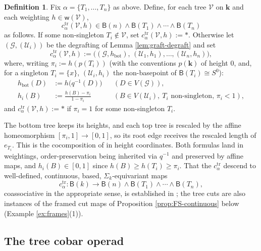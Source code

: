 \documentclass[12pt]{amsart}
\theoremstyle{definition}
\newtheorem{definition}[subsection]{Definition}
\theoremstyle{remark}
\newcommand{\Cal}[1]{\mathcal{#1}}
\newcommand{\BC}{\mathsf{B}}                     %
\newcommand{\wt}{\mathsf{w}}                     %
\newcommand{\basept}{\ast}
\begin{document}
\begin{definition}\label{def:cut}
Fix $\alpha = \{T_1,\dots,T_n\}$ as above. Define, for each tree $\Cal{V}$ on $\mathbf{k}$ and each weighting $h\in \wt(\Cal{V})$,
\[ c^{\mathrm{tr}}_{\alpha}(\Cal{V}, h) \in \BC(n)\wedge \BC(T_1)\wedge \cdots \wedge \BC(T_n)\]
as follows. If some non-singleton $T_i\notin \Cal{V}$, set $c^{\mathrm{tr}}_\alpha(\Cal{V},h) := \basept$. Otherwise let $(\Cal{G}, (\Cal{U}_i))$ be the degrafting of Lemma \ref{lem:graft-degraft} and set
\[ c^{\mathrm{tr}}_\alpha(\Cal{V},h) := \big( (\Cal{G}, h_{\mathrm{bot}}) ,\, (\Cal{U}_1, h_1), \dots, (\Cal{U}_n, h_n) \big), \]
where, writing $\pi_i := h(p(T_i))$ (with the conventions $p(\mathbf{k})$ of height $0$, and, for a singleton $T_i = \{x\}$, $(\Cal{U}_i, h_i)$ the non-basepoint of $\BC(T_i)\cong S^0$):
\begin{align}
    h_{\mathrm{bot}}(D) &:= h\big(q^{-1}(D)\big) && (D\in V(\Cal{G})), \label{eq:cut-bot}\\
    h_i(B) &:= \frac{h(B) - \pi_i}{1 - \pi_i} && (B \in V(\Cal{U}_i),\ \text{$T_i$ non-singleton, } \pi_i < 1), \label{eq:cut-top}
\end{align}
and $c^{\mathrm{tr}}_\alpha(\Cal{V},h) := \basept$ if $\pi_i = 1$ for some non-singleton $T_i$.
\end{definition}

The bottom tree keeps its heights, and each top tree is rescaled by the affine homeomorphism $[\pi_i, 1]\to [0,1]$, so its root edge receives the rescaled length of $e_{T_i}$. This is the cocomposition of \cite[Definition 4.16]{Ching-thesis} in height coordinates. Both formulas land in weightings, order-preservation being inherited via $q^{-1}$ and preserved by affine maps, and $h_i(B)\in[0,1]$ since $h(B)\geq h(T_i)\geq\pi_i$. That the $c^{\mathrm{tr}}_{\alpha}$ descend to well-defined, continuous, based, $\Sigma_k$-equivariant maps
\[ c^{\mathrm{tr}}_{\alpha}\colon \BC(k)\longrightarrow \BC(n)\wedge \BC(T_1)\wedge\cdots\wedge \BC(T_n),\]
coassociative in the appropriate sense, is established in \cite[\S 4]{Ching-thesis}; the tree cuts are also instances of the framed cut maps of Proposition \ref{prop:FS-continuous} below (Example \ref{ex:frames}(1)).

\subsection{The tree cobar operad}\label{sec:coassoc}
\end{document}
